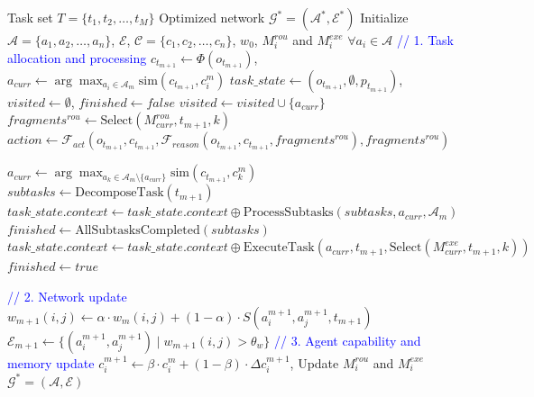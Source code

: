\documentclass{article}
\begin{document}
\begin{algorithm}[t]
\caption{AgentNet System}
\begin{algorithmic}[1]
\Require Task set $T = \{t_1, t_2, \ldots, t_M\}$
\Ensure Optimized network $\mathcal{G}^* = (\boldsymbol{\mathcal{A}}^*, \boldsymbol{\mathcal{E}}^*)$
\State Initialize $\boldsymbol{\mathcal{A}} = \{a_1, a_2, \dots, a_n\}$, $\boldsymbol{\mathcal{E}}$, $\boldsymbol{\mathcal{C}} = \{c_1, c_2, \dots, c_n\}$, $w_0$, $M_i^{rou}$ and $M_i^{exe}$ $\forall a_i \in \boldsymbol{\mathcal{A}}$
    \State \textcolor{blue}{// 1. Task allocation and processing}
    \State $c_{t_{m+1}} \gets \Phi(o_{t_{m+1}})$, $a_{curr} \gets \arg\max_{a_i \in \mathcal{A}_m} \text{sim}(c_{t_{m+1}}, c_i^m)$
    \State $task\_state \gets (o_{t_{m+1}}, \emptyset, p_{t_{m+1}})$, $visited \gets \emptyset$, $finished \gets false$
        \State $visited \gets visited \cup \{a_{curr}\}$
        \State $fragments^{rou} \gets \text{Select}(M_{curr}^{rou}, t_{m+1}, k)$
        \State $action \gets \mathcal{F}_{act}(o_{t_{m+1}}, c_{t_{m+1}}, \mathcal{F}_{reason}(o_{t_{m+1}}, c_{t_{m+1}}, fragments^{rou}), fragments^{rou})$
        
            \State $a_{curr} \gets \arg\max_{a_k \in \mathcal{A}_m \setminus \{a_{curr}\}} \text{sim}(c_{t_{m+1}}, c_k^m)$            
            \State $subtasks \gets \text{DecomposeTask}(t_{m+1})$
            \State $task\_state.context \gets task\_state.context \oplus \text{ProcessSubtasks}(subtasks, a_{curr}, \mathcal{A}_m)$
            \State $finished \gets \text{AllSubtasksCompleted}(subtasks)$            
        \Else
            \State $task\_state.context \gets task\_state.context \oplus \text{ExecuteTask}(a_{curr}, t_{m+1}, \text{Select}(M_{curr}^{exe}, t_{m+1}, k))$
            \State $finished \gets true$
        \EndIf
    \EndWhile
    
    \State \textcolor{blue}{// 2. Network update}
        \State $w_{m+1}(i, j) \gets \alpha \cdot w_m(i, j) + (1-\alpha) \cdot S(a_i^{m+1}, a_j^{m+1}, t_{m+1})$
    \EndFor    
    \State $\boldsymbol{\mathcal{E}}_{m+1} \gets \{(a_i^{m+1}, a_j^{m+1}) \mid w_{m+1}(i, j) > \theta_w\}$
    \State \textcolor{blue}{// 3. Agent capability and memory update}
        \State $c_i^{m+1} \gets \beta \cdot c_i^m + (1-\beta) \cdot \Delta c_i^{m+1}$, Update $M_i^{rou}$ and $M_i^{exe}$
    \EndFor
\EndFor
\State \Return $\mathcal{G}^* = (\boldsymbol{\mathcal{A}}, \boldsymbol{\mathcal{E}})$
\end{algorithmic}
\end{algorithm}
\end{document}
